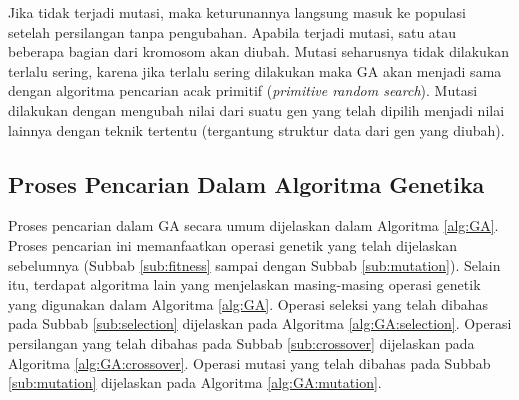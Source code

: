 Jika tidak terjadi mutasi, maka keturunannya langsung masuk ke populasi setelah persilangan tanpa pengubahan. Apabila terjadi mutasi, satu atau beberapa bagian dari kromosom akan diubah. Mutasi seharusnya tidak dilakukan terlalu sering, karena jika terlalu sering dilakukan maka GA akan menjadi sama dengan algoritma pencarian acak primitif (\textit{primitive random search}). Mutasi dilakukan dengan mengubah nilai dari suatu gen yang telah dipilih menjadi nilai lainnya dengan teknik tertentu (tergantung struktur data dari gen yang diubah).

\subsection{Proses Pencarian Dalam Algoritma Genetika}
Proses pencarian dalam GA secara umum dijelaskan dalam Algoritma \ref{alg:GA}. Proses pencarian ini memanfaatkan operasi genetik yang telah dijelaskan sebelumnya (Subbab \ref{sub:fitness} sampai dengan Subbab \ref{sub:mutation}). Selain itu, terdapat algoritma lain yang menjelaskan masing-masing operasi genetik yang digunakan dalam Algoritma \ref{alg:GA}. Operasi seleksi yang telah dibahas pada Subbab \ref{sub:selection} dijelaskan pada Algoritma \ref{alg:GA:selection}. Operasi persilangan yang telah dibahas pada Subbab \ref{sub:crossover} dijelaskan pada Algoritma \ref{alg:GA:crossover}. Operasi mutasi yang telah dibahas pada Subbab \ref{sub:mutation} dijelaskan pada Algoritma \ref{alg:GA:mutation}.

